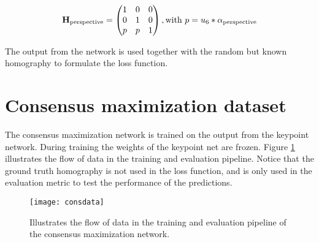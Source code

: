 \begin{equation}
\textbf{H}_{\mathrm{perspective}} = 
\begin{pmatrix}
1 & 0 & 0 \\
0 & 1 & 0 \\
p & p & 1 \\
\end{pmatrix}
, \text{with}
\ p=u_6*\alpha_{\mathrm{perspective}} \\
\end{equation}

The output from the network is used together with the random but known homography to formulate the loss function.

\section{Consensus maximization dataset}

The consensus maximization network is trained on the output from the keypoint network. During training the weights of the keypoint net are frozen. Figure \ref{fig:consdata} illustrates the flow of data in the training and evaluation pipeline. Notice that the ground truth homography is not used in the loss function, and is only used in the evaluation metric to test the performance of the predictions.

\begin{figure}[H]
	\centering
	\texttt{[image: consdata]}
	\caption{Illustrates the flow of data in the training and evaluation pipeline of the consensus maximization network.}
	\label{fig:consdata}
\end{figure}
